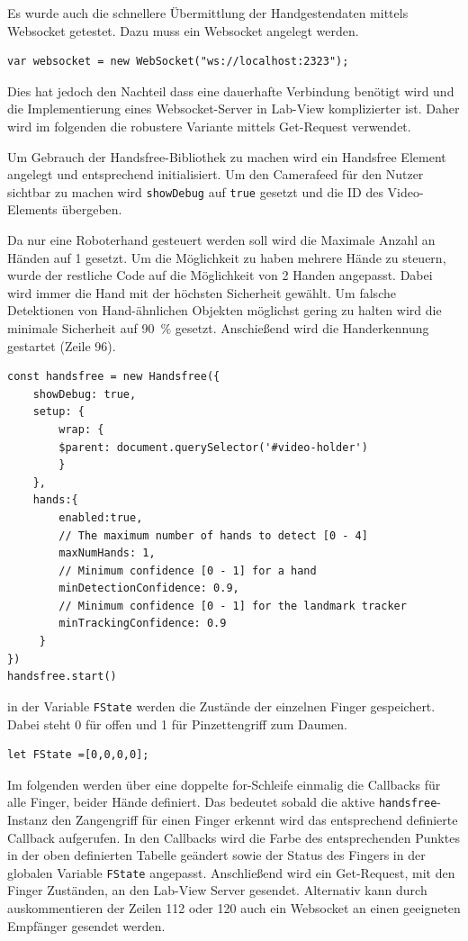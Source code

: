 \documentclass[a4paper,12pt,final]{article} %
\numberwithin{equation}{section} %
\numberwithin{figure}{section} %
\numberwithin{table}{section} %
\begin{document}
Es wurde auch die schnellere Übermittlung der Handgestendaten mittels Websocket getestet. Dazu muss ein Websocket angelegt werden.
\begin{lstlisting}[firstnumber=99]
var websocket = new WebSocket("ws://localhost:2323");
\end{lstlisting}
Dies hat jedoch den Nachteil dass eine dauerhafte Verbindung benötigt wird und die Implementierung eines Websocket-Server in Lab-View komplizierter ist. Daher wird im folgenden die robustere Variante mittels Get-Request verwendet.

Um Gebrauch der Handsfree-Bibliothek zu machen wird ein Handsfree Element angelegt und entsprechend initialisiert.  Um den Camerafeed für den Nutzer sichtbar zu machen wird \texttt{showDebug} auf \texttt{true} gesetzt und die ID des Video-Elements übergeben.

Da nur eine Roboterhand gesteuert werden soll wird die Maximale Anzahl an Händen auf 1 gesetzt. Um die Möglichkeit zu haben mehrere Hände zu steuern, wurde der restliche Code auf die Möglichkeit von 2 Handen angepasst. Dabei wird immer die Hand mit der höchsten Sicherheit gewählt. Um falsche Detektionen von Hand-ähnlichen Objekten möglichst gering zu halten wird die minimale Sicherheit auf 90~\% gesetzt. 
Anschießend wird die Handerkennung gestartet (Zeile 96).


\begin{lstlisting}[firstnumber=79]
const handsfree = new Handsfree({
	showDebug: true,
	setup: {
		wrap: {
		$parent: document.querySelector('#video-holder')
		}
	},
	hands:{
		enabled:true,
		// The maximum number of hands to detect [0 - 4]
		maxNumHands: 1,
		// Minimum confidence [0 - 1] for a hand 
		minDetectionConfidence: 0.9,
		// Minimum confidence [0 - 1] for the landmark tracker
		minTrackingConfidence: 0.9
	 }
})
handsfree.start()
\end{lstlisting}

in der Variable \texttt{FState} werden die Zustände der einzelnen Finger gespeichert. Dabei steht 0 für offen und 1 für Pinzettengriff zum Daumen.
\begin{lstlisting}[firstnumber=101]
let FState =[0,0,0,0];
\end{lstlisting}

Im folgenden werden über eine doppelte for-Schleife einmalig die Callbacks für alle Finger, beider Hände definiert.  Das bedeutet sobald die aktive \texttt{handsfree}-Instanz den Zangengriff für einen Finger erkennt wird das entsprechend definierte Callback auf\-ge\-ruf\-en.
In den Callbacks wird die Farbe des entsprechenden Punktes in der oben definierten Tabelle geändert sowie der Status des Fingers in der globalen Variable \texttt{FState} angepasst. 
Anschließend wird ein Get-Request, mit den Finger Zuständen, an den Lab-View Server gesendet.
Alternativ kann durch auskommentieren der Zeilen 112 oder 120 auch ein Websocket an einen geeigneten Empfänger gesendet werden.
\end{document}
